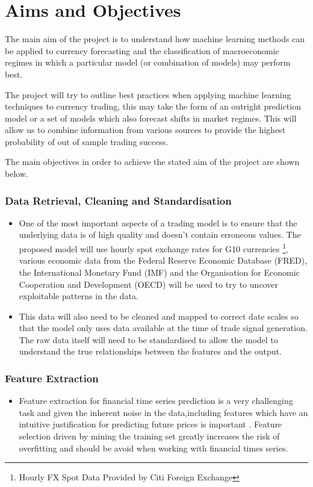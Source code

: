 \documentclass[11pt, a4paper]{article}
\begin{document}
\section{Aims and Objectives}
The main aim of the project is to understand how machine learning methods can be applied to currency forecasting and the classification of macroeconomic regimes in which a particular model (or combination of models) may perform best.
\par The project will try to outline best practices when applying machine learning techniques to currency trading, this may take the form of an outright prediction model or a set of models which also forecast shifts in market regimes. This will allow us to combine information from various sources to provide the highest probability of out of sample trading success.

The main objectives in order to achieve the stated aim of the project are shown below.

\subsubsection{Data Retrieval, Cleaning and Standardisation}
\begin{itemize}
\item One of the most important aspects of a trading model is to ensure that the underlying data is of high quality and doesn't contain erroneous values. The proposed model will use hourly spot exchange rates for G10 currencies \footnote{Hourly FX Spot Data Provided by Citi Foreign Exchange}, various economic data from the Federal Reserve Economic Database (FRED), the International Monetary Fund (IMF) and the Organisation for Economic Cooperation and Development (OECD) will be used to try to uncover exploitable patterns in the data. 
\item This data will also need to be cleaned and mapped to correct date scales so that the model only uses data available at the time of trade signal generation. The raw data itself will need to be standardised to allow the model to understand the true relationships between the features and the output.
\end{itemize}
 \subsubsection{Feature Extraction}
	\begin{itemize}
	\item Feature extraction for financial time series prediction is a very challenging task and given the inherent noise in the data,including features which have an intuitive justification for predicting future prices is important \cite{Arnott2018}. Feature selection driven by mining the training set greatly increases the risk of overfitting and should be avoid when working with financial times series. 
	\end{itemize}
\end{document}
